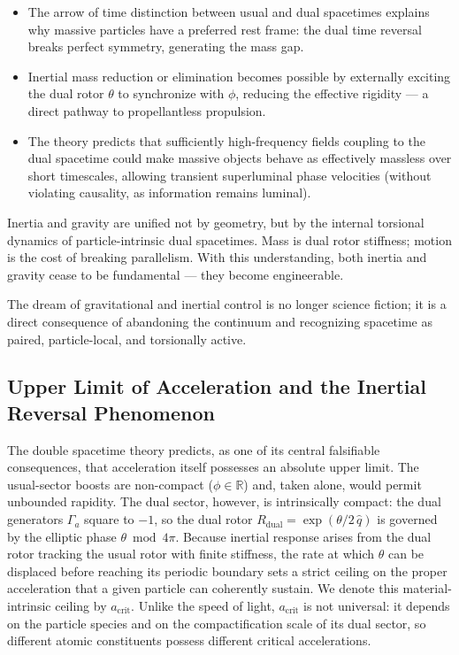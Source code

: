 \documentclass[dvipdfmx,a4paper]{article}
\begin{document}
\begin{itemize}
\item The arrow of time distinction between usual and dual spacetimes explains why massive particles have a preferred rest frame: the dual time reversal breaks perfect symmetry, generating the mass gap.
\item Inertial mass reduction or elimination becomes possible by externally exciting the dual rotor $\theta$ to synchronize with $\phi$, reducing the effective rigidity — a direct pathway to propellantless propulsion.
\item The theory predicts that sufficiently high-frequency fields coupling to the dual spacetime could make massive objects behave as effectively massless over short timescales, allowing transient superluminal phase velocities (without violating causality, as information remains luminal).
\end{itemize}

Inertia and gravity are unified not by geometry, but by the internal torsional dynamics of particle-intrinsic dual spacetimes. Mass is dual rotor stiffness; motion is the cost of breaking parallelism. With this understanding, both inertia and gravity cease to be fundamental — they become engineerable.

The dream of gravitational and inertial control is no longer science fiction; it is a direct consequence of abandoning the continuum and recognizing spacetime as paired, particle-local, and torsionally active.

\subsection{Upper Limit of Acceleration and the Inertial Reversal Phenomenon}
\label{subsec:acceleration-limit}

The double spacetime theory predicts, as one of its central falsifiable consequences, that acceleration itself possesses an absolute upper limit. The usual-sector boosts are non-compact ($\phi \in \mathbb{R}$) and, taken alone, would permit unbounded rapidity. The dual sector, however, is intrinsically compact: the dual generators $\Gamma_a$ square to $-1$, so the dual rotor $R_\text{dual} = \exp(\theta/2 \, \hat q)$ is governed by the elliptic phase $\theta \bmod 4\pi$. Because inertial response arises from the dual rotor tracking the usual rotor with finite stiffness, the rate at which $\theta$ can be displaced before reaching its periodic boundary sets a strict ceiling on the proper acceleration that a given particle can coherently sustain. We denote this material-intrinsic ceiling by $a_\text{crit}$. Unlike the speed of light, $a_\text{crit}$ is not universal: it depends on the particle species and on the compactification scale of its dual sector, so different atomic constituents possess different critical accelerations.
\end{document}

